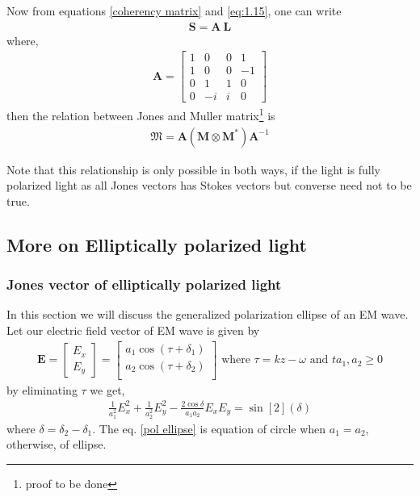 \documentclass[11pt,a4paper]{article}
\numberwithin{equation}{section}
\begin{document}
Now from equations \ref{coherency matrix} and \ref{eq:1.15}, one can write
\begin{align}
	\boldsymbol{S}=\boldsymbol{A}\:\boldsymbol{L}
\end{align}
where,
\begin{align}
	\boldsymbol{A}=
	\begin{bmatrix}
		1 & 0 & 0 & 1 \\
		1 & 0 & 0 & -1 \\
		0 & 1 & 1 & 0 \\
		0 & -i & i & 0
	\end{bmatrix}
\end{align}
then the relation between Jones and Muller matrix\footnote{proof to be done} is
\begin{align}
	\boldsymbol{\mathfrak{M}}=\boldsymbol{A} \left(\boldsymbol{M}\otimes\boldsymbol{M}^\ast\right) \boldsymbol{A}^{-1}
\end{align} 

Note that this relationship is only possible in both ways, if the light is fully polarized light as all Jones vectors has Stokes vectors but converse need not to be true.

\subsection{More on Elliptically polarized light}
\subsubsection{Jones vector of elliptically polarized light}
In this section we will discuss the generalized polarization ellipse of an EM wave. Let our electric field vector of EM wave is given by
\begin{align}
	\boldsymbol{E} =
	\begin{bmatrix}
		E_x\\E_y
	\end{bmatrix}=
	\begin{bmatrix}
		a_1 \cos(\tau+\delta_1)\\
		a_2 \cos(\tau+\delta_2)\\
	\end{bmatrix}
	\text{ where }
	\tau = kz-\omega \text{ and } t a_1,a_2\ge0
\end{align}
by eliminating $\tau$ we get,
\begin{align}
	\frac{1}{a_1^2}E_x^2 +\frac{1}{a_2^2}E_y^2 -\frac{2\cos\delta}{a_1 a_2} E_x E_y = \sin[2](\delta)
	\label{pol ellipse}
\end{align}
where $\delta = \delta_2-\delta_1$.
The eq. \ref{pol ellipse} is equation of circle when $a_1 = a_2$, otherwise, of ellipse\cite{born-wolf}.
\end{document}
